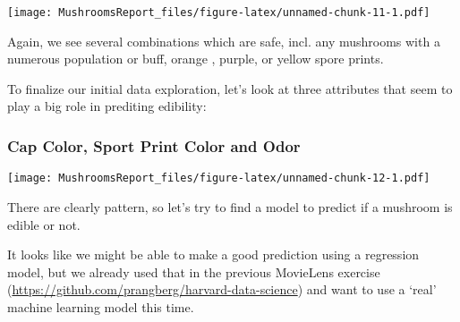 \documentclass[]{article}
\newenvironment{Shaded}{\begin{snugshade}}{\end{snugshade}}
\newcommand{\KeywordTok}[1]{\textcolor[rgb]{0.13,0.29,0.53}{\textbf{#1}}}
\newcommand{\DataTypeTok}[1]{\textcolor[rgb]{0.13,0.29,0.53}{#1}}
\newcommand{\DecValTok}[1]{\textcolor[rgb]{0.00,0.00,0.81}{#1}}
\newcommand{\FloatTok}[1]{\textcolor[rgb]{0.00,0.00,0.81}{#1}}
\newcommand{\StringTok}[1]{\textcolor[rgb]{0.31,0.60,0.02}{#1}}
\newcommand{\OperatorTok}[1]{\textcolor[rgb]{0.81,0.36,0.00}{\textbf{#1}}}
\newcommand{\NormalTok}[1]{#1}
\begin{document}
\texttt{[image: MushroomsReport\_files/figure-latex/unnamed-chunk-11-1.pdf]}

Again, we see several combinations which are safe, incl. any mushrooms
with a numerous population or buff, orange , purple, or yellow spore
prints.

To finalize our initial data exploration, let's look at three attributes
that seem to play a big role in prediting edibility:

\subsubsection{Cap Color, Sport Print Color and
Odor}\label{cap-color-sport-print-color-and-odor}

\begin{Shaded}
\end{Shaded}

\texttt{[image: MushroomsReport\_files/figure-latex/unnamed-chunk-12-1.pdf]}

There are clearly pattern, so let's try to find a model to predict if a
mushroom is edible or not.

It looks like we might be able to make a good prediction using a
regression model, but we already used that in the previous MovieLens
exercise (\url{https://github.com/prangberg/harvard-data-science}) and
want to use a `real' machine learning model this time.
\end{document}
